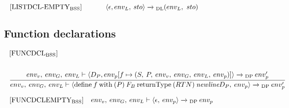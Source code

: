 \begin{equation}
\begin{minipage}{.2\linewidth}
$[\text{LISTDCL-EMPTY}_\text{BSS}]$
\end{minipage}
\begin{minipage}{.8\linewidth}
\centering
$\langle \epsilon, env_L, \: sto\rangle \xrightarrow{}\textsubscript{DL} (env_L, \ sto)$
\end{minipage}
\end{equation}
\subsection*{Function declarations}
\begin{equation}
\begin{split}
\begin{minipage}{\linewidth}
$[\text{FUNCDCL}_\text{BSS}]$
\end{minipage}
\\\\
\begin{minipage}{\linewidth}
\centering
$\cfrac{env_v, \: env_G, \: env_L \vdash \langle D_P, env_p[f \mapsto (S, \: P, \: env_v, \: env_G, \: env_L, \: env_p)]\rangle \xrightarrow{}\textsubscript{DP} \: env'_p}{env_v, \: env_G, \: env_L \vdash \langle \text{define} \: f \: \text{with} \: (P) \: {F_B} \: \text{returnType} \: (RTN) \: \textit{newline} D_P, \: env_p\rangle \xrightarrow{}\textsubscript{DP} \: env_p'}$
\end{minipage}
\end{split}
\end{equation}

\begin{equation}
\begin{minipage}{.2\linewidth}
$[\text{FUNCDCLEMPTY}_\text{BSS}]$
\end{minipage}
\begin{minipage}{.8\linewidth}
\centering
$env_v, \: env_G, \: env_L \vdash \langle \epsilon, \: env_p \rangle \xrightarrow{}\textsubscript{DP} \: env_p$
\end{minipage}
\end{equation}

